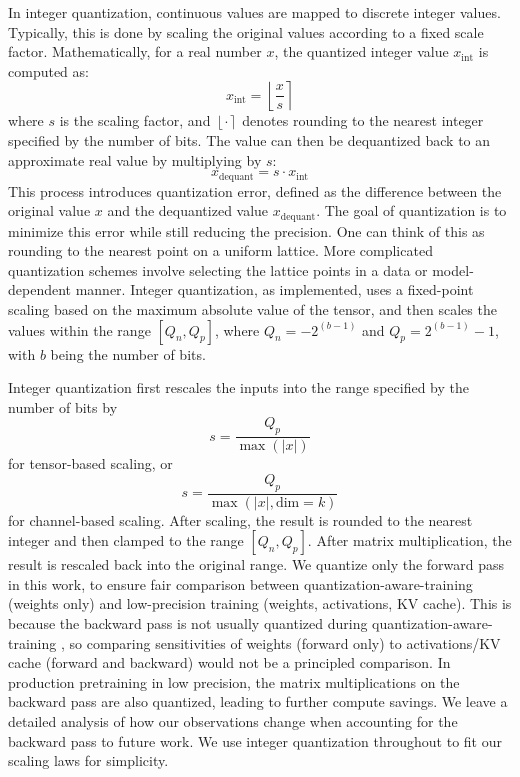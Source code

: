 \documentclass[11pt]{article}
\begin{document}
In integer quantization, continuous values are mapped to discrete integer values. Typically, this is done by scaling the original values according to a fixed scale factor. Mathematically, for a real number \( x \), the quantized integer value \( x_{\text{int}} \) is computed as:
\[
x_{\text{int}} = \left\lfloor \frac{x}{s} \right\rceil
\]
where \( s \) is the scaling factor, and \( \left\lfloor \cdot \right\rceil \) denotes rounding to the nearest integer specified by the number of bits. The value can then be dequantized back to an approximate real value by multiplying by \( s \):
\[
x_{\text{dequant}} = s \cdot x_{\text{int}}
\]
This process introduces quantization error, defined as the difference between the original value \( x \) and the dequantized value \( x_{\text{dequant}} \). The goal of quantization is to minimize this error while still reducing the precision. One can think of this as rounding to the nearest point on a uniform lattice. More complicated quantization schemes involve selecting the lattice points in a data or model-dependent manner. Integer quantization, as implemented, uses a fixed-point scaling based on the maximum absolute value of the tensor, and then scales the values within the range \([Q_n, Q_p]\), where \( Q_n = -2^{(b-1)} \) and \( Q_p = 2^{(b-1)} - 1 \), with \( b \) being the number of bits.

Integer quantization first rescales the inputs into the range specified by the number of bits by 
\[
s = \frac{Q_p}{\max(|x|)}
\]
for tensor-based scaling, or
\[
s = \frac{Q_p}{\max(|x|, \text{dim}=k)}
\]
for channel-based scaling. After scaling, the result is rounded to the nearest integer and then clamped to the range \([Q_n, Q_p]\). After matrix multiplication, the result is rescaled back into the original range. We quantize only the forward pass in this work, to ensure fair comparison between quantization-aware-training (weights only) and low-precision training (weights, activations, KV cache). This is because the backward pass is not usually quantized during quantization-aware-training \citep{ma2024era}, so comparing sensitivities of weights (forward only) to activations/KV cache (forward and backward) would not be a principled comparison. In production pretraining in low precision, the matrix multiplications on the backward pass are also quantized, leading to further compute savings. We leave a detailed analysis of how our observations change when accounting for the backward pass to future work. We use integer quantization throughout to fit our scaling laws for simplicity. 
\end{document}
